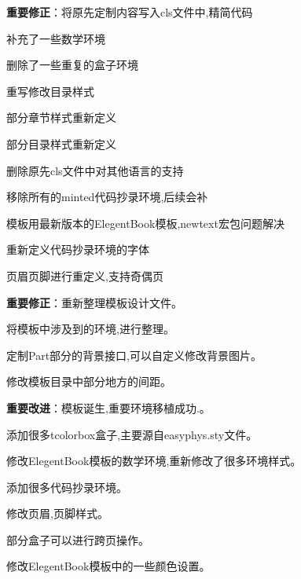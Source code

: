 \begin{change}
 \item \textbf{重要修正}：将原先定制内容写入cls文件中,精简代码
\item 补充了一些数学环境
\item 删除了一些重复的盒子环境
\item 重写修改目录样式
\item {}
\item 部分章节样式重新定义
\item 部分目录样式重新定义
\item 删除原先cls文件中对其他语言的支持
\item 移除所有的minted代码抄录环境,后续会补
\item 模板用最新版本的ElegentBook模板,newtext宏包问题解决
\item 重新定义代码抄录环境的字体
\item 页眉页脚进行重定义,支持奇偶页
\end{change}


\begin{change}
  \item \textbf{重要修正}：重新整理模板设计文件。
  \item 将模板中涉及到的环境,进行整理。
  \item 定制Part部分的背景接口,可以自定义修改背景图片。
  \item 修改模板目录中部分地方的间距。
\end{change}



\begin{change}
  \item \textbf{重要改进}：模板诞生,重要环境移植成功.。
  \item 添加很多tcolorbox盒子,主要源自easyphys.sty文件。
  \item 修改ElegentBook模板的数学环境,重新修改了很多环境样式。
  \item 添加很多代码抄录环境。
  \item 修改页眉,页脚样式。
  \item 部分盒子可以进行跨页操作。
  \item 修改ElegentBook模板中的一些颜色设置。
\end{change}

